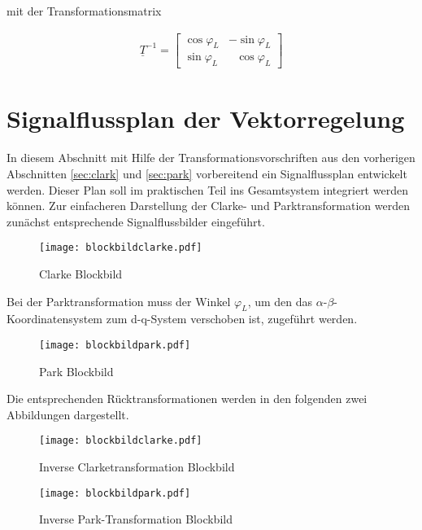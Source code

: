 mit der Transformationsmatrix

\begin{align}
	\underline{T}^{-1} =
	\begin{bmatrix}
		\cos{\varphi_{L}} & -\sin{\varphi_{L}} \\
		\sin{\varphi_{L}} & ~~~\cos{\varphi_{L}}
	\end{bmatrix}
	\label{parkmatrixinvers}
\end{align}



\section{Signalflussplan der Vektorregelung}\label{sec:signalflussplan}

In diesem Abschnitt mit Hilfe der Transformationsvorschriften aus den vorherigen Abschnitten \ref{sec:clark} und \ref{sec:park} vorbereitend ein Signalflussplan entwickelt werden.
Dieser Plan soll im praktischen Teil ins Gesamtsystem integriert werden können.
Zur einfacheren Darstellung der Clarke- und Parktransformation werden zunächst entsprechende Signalflussbilder eingeführt.

\begin{figure}[h]
	\centering
	\texttt{[image: blockbildclarke.pdf]}
	\label{fig:blockbildclarke}
	\caption{Clarke Blockbild}
\end{figure}

Bei der Parktransformation muss der Winkel $\varphi_{L}$, um den das $\alpha$-$\beta$-Koordinatensystem zum d-q-System verschoben ist, zugeführt werden.

\begin{figure}[h]
	\centering
	\texttt{[image: blockbildpark.pdf]}
	\label{fig:blockbildpark}
	\caption{Park Blockbild}
\end{figure}

Die entsprechenden Rücktransformationen werden in den folgenden zwei Abbildungen dargestellt.

\begin{figure}[h]
	\centering
	\texttt{[image: blockbildclarke.pdf]}
	\label{fig:blockbildinverseclarke}
	\caption{Inverse Clarketransformation Blockbild}
\end{figure}

\begin{figure}[h]
	\centering
	\texttt{[image: blockbildpark.pdf]}
	\label{fig:blockbildinversepark}
	\caption{Inverse Park-Transformation Blockbild}
\end{figure}

